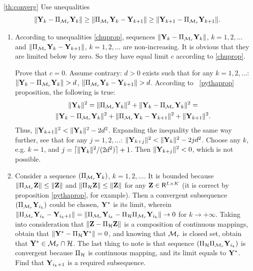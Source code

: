 \documentclass[12pt,a4paper,fleqn,leqno]{article}
\begin{document}
\begin{proof2}{\ref{th:converg}}
Use unequalities \cite{Chu.etal2003}
\begin{equation}
\label{chuprop}
\|\mathbf{Y}_k - \Pi_{\mathcal{M}_r} \mathbf{Y}_k\| \ge \|\Pi_{\mathcal{M}_r} \mathbf{Y}_k - \mathbf{Y}_{k + 1}\| \ge \|\mathbf{Y}_{k+1} - \Pi_{\mathcal{M}_r} \mathbf{Y}_{k + 1}\|.
\end{equation}

\begin{enumerate}
\item According to unequalities \eqref{chuprop}, sequences $\|\mathbf{Y}_k - \Pi_{\mathcal{M}_r} \mathbf{Y}_k\|$, $k = 1, 2, \ldots$ and $\|\Pi_{\mathcal{M}_r} \mathbf{Y}_k - \mathbf{Y}_{k + 1}\|$, $k = 1, 2, \ldots$ are non-increasing. It is obvious that they are limited below by zero. So they have equal limit $c$ according to \eqref{chuprop}.

Prove that $c = 0$. Assume contrary: $d > 0$ exists such that for any $k = 1, 2, \ldots$: $\|\mathbf{Y}_k - \Pi_{\mathcal{M}_r} \mathbf{Y}_k\| > d$, $\|\Pi_{\mathcal{M}_r} \mathbf{Y}_k - \mathbf{Y}_{k + 1}\| > d$. According to ~\ref{pythaprop} proposition, the following is true:
\begin{gather*}
\|\mathbf{Y}_k\|^2 = \|\Pi_{\mathcal{M}_r} \mathbf{Y}_k\|^2 + \|\mathbf{Y}_k - \Pi_{\mathcal{M}_r} \mathbf{Y}_k\|^2 =\\ \|\mathbf{Y}_k - \Pi_{\mathcal{M}_r} \mathbf{Y}_k\|^2 + \|\Pi_{\mathcal{M}_r} \mathbf{Y}_k - \mathbf{Y}_{k + 1}\|^2 + \|\mathbf{Y}_{k + 1}\|^2.
\end{gather*}
Thus, $\|\mathbf{Y}_{k+1}\|^2 < \|\mathbf{Y}_k\|^2 - 2d^2$. Expanding the inequality the same way further, see that for any $j = 1, 2, \ldots$: $\|\mathbf{Y}_{k+j}\|^2 < \|\mathbf{Y}_k\|^2 - 2 j d^2$. Choose any $k$, e.g. $k = 1$, and $j = \lceil \|\mathbf{Y}_k\|^2 / (2d^2) \rceil + 1$. Then $\|\mathbf{Y}_{k+j}\|^2 < 0$, which is not possible.
\item Consider a sequence $(\Pi_{\mathcal{M}_r} \mathbf{Y}_k)$, $k = 1, 2, \ldots$. It is bounded because $\|\Pi_{\mathcal{M}_r} \mathbf{Z}\| \le \|\mathbf{Z}\|$ and $\|\Pi_{\mathcal{H}} \mathbf{Z}\| \le \|\mathbf{Z}\|$ for any $\mathbf{Z} \in \mathsf{R}^{L \times K}$ (it is correct by proposition \ref{pythaprop}, for example). Then a convergent subsequence $(\Pi_{\mathcal{M}_r} \mathbf{Y}_{i_k})$ could be chosen, $\mathbf{Y}^*$ is its limit, wherein $\|\Pi_{\mathcal{M}_r} \mathbf{Y}_{i_k} - \mathbf{Y}_{i_k + 1}\| = \|\Pi_{\mathcal{M}_r} \mathbf{Y}_{i_k} - \Pi_{\mathcal{H}} \Pi_{\mathcal{M}_r} \mathbf{Y}_{i_k}\| \to 0$ for $k \to + \infty$. Taking into consideration that $\|\mathbf{Z} - \Pi_{\mathcal{H}} \mathbf{Z}\|$ is a composition of continuous mappings, obtain that $\|\mathbf{Y}^* - \Pi_{\mathcal{H}} \mathbf{Y}^*\| = 0$, and knowing that $\mathcal{M}_r$ is closed set, obtain that $\mathbf{Y}^* \in \mathcal{M}_r \cap \mathcal{H}$. The last thing to note is that sequence $(\Pi_{\mathcal{H}} \Pi_{\mathcal{M}_r} \mathbf{Y}_{i_k})$ is convergent because $\Pi_{\mathcal{H}}$ is continuous mapping, and its limit equals to $\mathbf{Y}^*$. Find that $\mathbf{Y}_{i_k + 1}$ is a required subsequence.
\end{enumerate}
\end{proof2}
\end{document}
